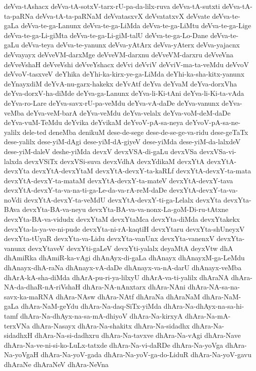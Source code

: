 {deVva-tAshacx
deVva-tA-sotxV-tarx-rU-pa-da-lilx-ruva
deVva-tA-sutxti
deVva-tA-ta-paRNa
deVva-tA-ta-paRNaM
deVvatasxvX
deVvatatxvX
deVvate
deVva-te-gaLa
deVva-te-ga-Lanunx
deVva-te-ga-LiMda
deVva-te-ga-LiMtu
deVva-te-ga-Lige
deVva-te-ga-Li-giMta
deVva-te-ga-Li-giM-talU
deVva-te-ga-Lo-Dane
deVva-te-gaLu
deVva-teya
deVva-te-yanunx
deVva-yAtArx
deVva-yAterx
deVva-yajacnx
deVvayayx
deVveVM-darxMge
deVveVM-darxnu
deVveVM-darxru
deVveVna
deVveVshaH
deVveVshi
deVveYshacx
deVvi
deVviV
deVviV-ma-ta-veMdu
deVvoV
deVvoV-tasxveV
deYhika
deYhi-ka-kirx-ye-ga-LiMda
deYhi-ka-sha-kitx-yanunx
deYnayxdiM
deYvA-nu-garx-hakekx
deYvAtf
deYva
deYvaM
deYva-dorxVha
deYva-dorxV-ha-diMde
deYva-ga-Lanunx
deYva-li-Ki-tAni
deYva-li-Ki-ta-vAda
deYva-ro-Lare
deYva-savx-rU-pa-veMdu
deYva-vA-daDe
deYva-vanunx
deYva-veMba
deYva-veM-barA
deYva-veMdu
deYva-velalx
deYva-voM-deM-daDe
deYva-vuM-TeMdu
deYvika
deYvikaM
deYvoV-pA-sa-neya
deYvoV-pA-sa-ne-yalilx
dele-ted
deneMba
denikuM
dese-de-sege
dese-de-se-ge-va-ridu
dese-geTaTx
dese-yalilx
dese-yiM-dAgi
dese-yiM-dA-giyeV
dese-yiMda
dese-yiM-da-lalxdeV
dese-yiM-daleV
deshe-yiMda
devxV
devxVSA-di-gaLu
devxVSa
devxVSa-vi-lalxda
devxVSiTx
devxVSi-suva
devxVdhA
devxYdikaM
devxYtA
devxYtA-devxYta
devxYtA-devxYtaM
devxYtA-devxY-ta-kaRLf
devxYtA-devxY-ta-mata
devxYtA-devxY-ta-mataM
devxYtA-devxY-ta-mateV
devxYtA-devxY-tava
devxYtA-devxY-ta-va-na-ti-ga-Le-da-va-rA-reM-daDe
devxYtA-devxY-ta-va-noVdi
devxYtA-devxY-ta-veMdU
devxYtA-devxY-ti-ga-Lelalx
devxYta
devxYta-BAva
devxYta-BA-va-neyu
devxYta-BA-va-va-nonx-La-goM-Di-ru-tAtxne
devxYta-BA-va-vidudx
devxYtaM
devxYtaMca
devxYta-diMda
devxYtakekx
devxYta-la-ya-ve-ni-pude
devxYta-ni-rA-kaqtiH
devxYtaru
devxYta-shUneyxV
devxYta-tUyaR
devxYta-va-Lidu
devxYta-vanUnx
devxYta-vanenxV
devxYta-vanunx
devxYtaveV
devxYti-gaLeV
devxYti-yalalx
deyaMtA
deyxVtw
dhA
dhAmiRka
dhAmiR-ka-vAgi
dhAnAyx-di-gaLa
dhAnayx
dhAnayxM-ga-LeMdu
dhAnayx-dhA-raNa
dhAnayx-vA-daDe
dhAnayx-va-nA-darU
dhAnayx-veMba
dhArA-kA-sha-diMda
dhArA-pu-ri-ya-lilxyU
dhArA-va-ti-yalilx
dhAraNA
dhAra-NA-da-dhaR-nA-riVshaH
dhAra-NA-nAnxtarx
dhAra-NAni
dhAra-NA-sa-na-savx-ka-maRNA
dhAra-NAsw
dhAra-NAtf
dhAraNa
dhAraNaM
dhAra-NaM-gaLa
dhAra-NaM-geYdu
dhAra-Na-daq-SiTx-yiMda
dhAra-Na-dhAyx-na-sa-hi-tamf
dhAra-Na-dhAyx-na-sa-mA-dhiyoV
dhAra-Na-kirxyA
dhAra-Na-mA-terxVNa
dhAra-Nasayx
dhAra-Na-shakitx
dhAra-Na-sidadhx
dhAra-Na-sidadhxH
dhAra-Na-si-dadhxru
dhAra-Na-tavxve
dhAra-Na-vAgi
dhAra-Nave
dhAra-Na-ve-ni-si-ko-LuLx-tatxde
dhAra-Na-vi-daRDe
dhAra-Na-yoVga
dhAra-Na-yoVgaH
dhAra-Na-yoV-gada
dhAra-Na-yoV-ga-do-LiduR
dhAra-Na-yoV-gavu
dhAraNe
dhAraNeV
dhAra-NeVna
}
